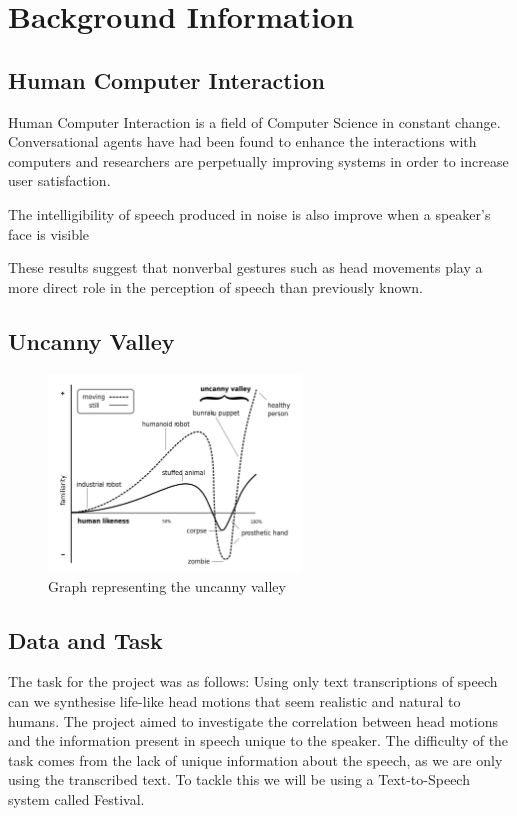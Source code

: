 \documentclass[bsc,frontabs,twoside,singlespacing,parskip]{infthesis}
\begin{document}
\chapter{Background Information}

\section{Human Computer Interaction}

Human Computer Interaction is a field of Computer Science in constant change. Conversational agents have had been found to enhance the interactions with computers  \cite{conv_agents}  and researchers are perpetually improving systems in order to increase user satisfaction. 

The intelligibility of speech produced in noise is also improve when a speaker's face is visible \cite{emotion_head_motion}

These results suggest that nonverbal gestures such as head movements play a more direct role in the perception of speech than previously known. \cite{vis_prosody}


\section{Uncanny Valley}

\begin{figure}[h!]
	\centering
	\includegraphics[width=0.6\textwidth]{uncanny}
	\caption{Graph representing the uncanny valley}
\end{figure}

\section{Data and Task}



The task for the project was as follows: Using only text transcriptions of speech can we synthesise life-like head motions that seem realistic and natural to humans. The project aimed to investigate the correlation between head motions and the information present in speech unique to the speaker. The difficulty of the task comes from the lack of unique information about the speech, as we are only using the transcribed text. To tackle this we will be using a Text-to-Speech system called Festival.
\end{document}
